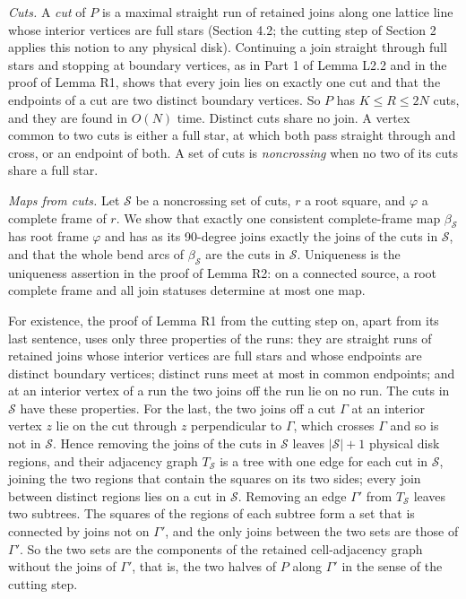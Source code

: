 \documentclass[
  11pt,
]{article}
\begin{document}
\emph{Cuts.} A \emph{cut} of \(P\) is a maximal straight run of retained
joins along one lattice line whose interior vertices are full stars
(Section 4.2; the cutting step of Section 2 applies this notion to any
physical disk). Continuing a join straight through full stars and
stopping at boundary vertices, as in Part 1 of Lemma L2.2 and in the
proof of Lemma R1, shows that every join lies on exactly one cut and
that the endpoints of a cut are two distinct boundary vertices. So \(P\)
has \(K\le R\le 2N\) cuts, and they are found in \(O(N)\) time. Distinct
cuts share no join. A vertex common to two cuts is either a full star,
at which both pass straight through and cross, or an endpoint of both. A
set of cuts is \emph{noncrossing} when no two of its cuts share a full
star.

\emph{Maps from cuts.} Let \(\mathcal S\) be a noncrossing set of cuts,
\(r\) a root square, and \(\varphi\) a complete frame of \(r\). We show
that exactly one consistent complete-frame map \(\beta_{\mathcal S}\)
has root frame \(\varphi\) and has as its 90-degree joins exactly the
joins of the cuts in \(\mathcal S\), and that the whole bend arcs of
\(\beta_{\mathcal S}\) are the cuts in \(\mathcal S\). Uniqueness is the
uniqueness assertion in the proof of Lemma R2: on a connected source, a
root complete frame and all join statuses determine at most one map.

For existence, the proof of Lemma R1 from the cutting step on, apart
from its last sentence, uses only three properties of the runs: they are
straight runs of retained joins whose interior vertices are full stars
and whose endpoints are distinct boundary vertices; distinct runs meet
at most in common endpoints; and at an interior vertex of a run the two
joins off the run lie on no run. The cuts in \(\mathcal S\) have these
properties. For the last, the two joins off a cut \(\Gamma\) at an
interior vertex \(z\) lie on the cut through \(z\) perpendicular to
\(\Gamma\), which crosses \(\Gamma\) and so is not in \(\mathcal S\).
Hence removing the joins of the cuts in \(\mathcal S\) leaves
\(\left|\mathcal S\right|+1\) physical disk regions, and their adjacency
graph \(T_{\mathcal S}\) is a tree with one edge for each cut in
\(\mathcal S\), joining the two regions that contain the squares on its
two sides; every join between distinct regions lies on a cut in
\(\mathcal S\). Removing an edge \(\Gamma'\) from \(T_{\mathcal S}\)
leaves two subtrees. The squares of the regions of each subtree form a
set that is connected by joins not on \(\Gamma'\), and the only joins
between the two sets are those of \(\Gamma'\). So the two sets are the
components of the retained cell-adjacency graph without the joins of
\(\Gamma'\), that is, the two halves of \(P\) along \(\Gamma'\) in the
sense of the cutting step.
\end{document}
